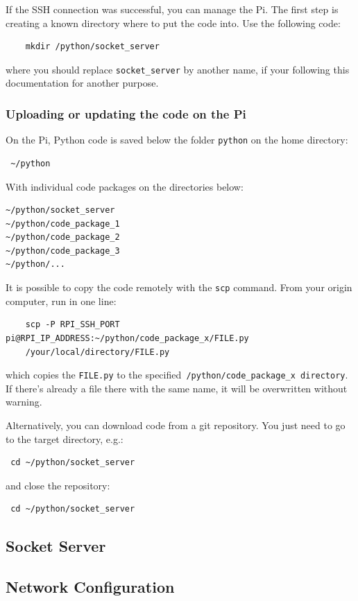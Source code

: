 \documentclass[twoside,a4paper]{refart}
\begin{document}
If the SSH connection was successful, you can manage the Pi. The first step is creating a known directory where to put the code into. Use the following code:

\begin{verbatim}
	mkdir /python/socket_server
\end{verbatim}
where you should replace {\tt socket\_server} by another name, if your following this documentation for another purpose.

\subsubsection{Uploading or updating the code on the Pi}
On the Pi, Python code is saved below the folder {\tt python} on the home directory:
\begin{verbatim} ~/python \end{verbatim}
With individual code packages on the directories below:
\begin{verbatim}
~/python/socket_server
~/python/code_package_1
~/python/code_package_2
~/python/code_package_3
~/python/...
\end{verbatim}

 It is possible to copy the code remotely with the {\tt scp} command. From your origin computer, run in one line:
\begin{verbatim}
	scp -P RPI_SSH_PORT pi@RPI_IP_ADDRESS:~/python/code_package_x/FILE.py
	/your/local/directory/FILE.py
\end{verbatim}
which copies the {\tt FILE.py} to the specified{\tt ~/python/code\_package\_x directory}.  If there's already a file there with the same name, it will be \attention overwritten without warning.

Alternatively, you can download code from a git repository\footnotemark. You just need to go to the target directory, e.g.:
\begin{verbatim} cd ~/python/socket_server
\end{verbatim}
and close the repository:
\begin{verbatim} cd ~/python/socket_server
\end{verbatim}


\subsection{Socket Server}
\subsection{Network Configuration}\label{sub:network_conf}
\end{document}
